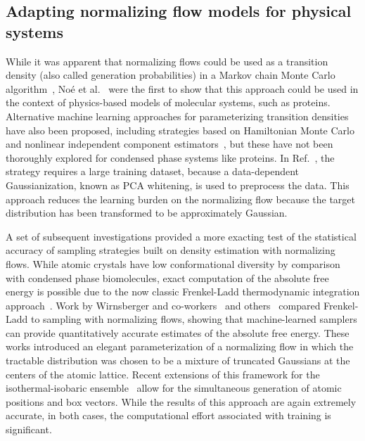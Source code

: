 \documentclass[11pt]{article}
\begin{document}
\subsection{Adapting normalizing flow models for physical systems}

While it was apparent that normalizing flows could be used as a transition density (also called generation probabilities) in a Markov chain Monte Carlo algorithm~\cite{rezende_variational_2015}, No\'{e} et al.~\cite{noe_boltzmann_2019} were the first to show that this approach could be used in the context of physics-based models of molecular systems, such as proteins.
Alternative machine learning approaches for parameterizing transition densities have also been proposed, including strategies based on Hamiltonian Monte Carlo~\cite{levy_generalizing_2018} and nonlinear independent component estimators~\cite{song_-nice-mc_2017}, but these have not been thoroughly explored for condensed phase systems like proteins. 
In Ref.~\cite{noe_boltzmann_2019}, the strategy requires a large training dataset, because a data-dependent Gaussianization, known as PCA whitening, is used to preprocess the data. 
This approach reduces the learning burden on the normalizing flow because the target distribution has been transformed to be approximately Gaussian. 

A set of subsequent investigations provided a more exacting test of the statistical accuracy of sampling strategies built on density estimation with normalizing flows. 
While atomic crystals have low conformational diversity by comparison with condensed phase biomolecules, exact computation of the absolute free energy is possible due to the now classic Frenkel-Ladd thermodynamic integration approach~\cite{frenkel_new_1984}.  
Work by Wirnsberger and co-workers~\cite{wirnsberger_normalizing_2021, wirnsberger_estimating_2023} and others~\cite{ahmad_free_2021} compared Frenkel-Ladd to sampling with normalizing flows, showing that machine-learned samplers can provide quantitatively accurate estimates of the absolute free energy.
These works introduced an elegant parameterization of a normalizing flow in which the tractable distribution was chosen to be a mixture of truncated Gaussians at the centers of the atomic lattice. 
Recent extensions of this framework for the isothermal-isobaric ensemble~\cite{wirnsberger_estimating_2023} allow for the simultaneous generation of atomic positions and box vectors.
While the results of this approach are again extremely accurate, in both cases, the computational effort associated with training is significant.
\end{document}

